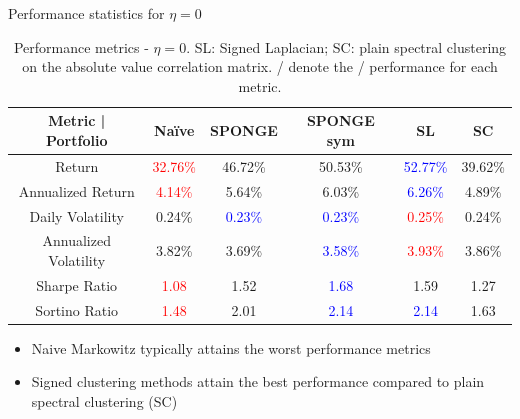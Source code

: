 \documentclass[dvipsnames,mathserif]{beamer}
\begin{document}
\begin{frame}{Performance statistics for $\eta=0$}
   \footnotesize
\vfill


\begin{table}[H]
    \centering
     \renewcommand{\arraystretch}{0.99}
    \begin{tabular}{|c|c|c|c|c|c|}
    \hline
    Metric | Portfolio & Naïve & SPONGE  & SPONGE sym & SL & SC \\ \hline
    Return & \textcolor{red}{32.76\%} & 46.72\% & 50.53\% & \textcolor{blue}{52.77\%} & 39.62\%\\ \hline
    Annualized Return & \textcolor{red}{4.14\%} & 5.64\% & 6.03\% & \textcolor{blue}{6.26\%} & 4.89\% \\ \hline
    Daily Volatility & 0.24\% & \textcolor{blue}{0.23\%} & \textcolor{blue}{0.23\%} & \textcolor{red}{0.25\%} & 0.24\% \\ \hline
    Annualized Volatility & 3.82\% & 3.69\% & \textcolor{blue}{3.58\%} & \textcolor{red}{3.93\%} &3.86\%\\ \hline
    Sharpe Ratio & \textcolor{red}{1.08} & 1.52 & \textcolor{blue}{1.68} & 1.59 &1.27\\ \hline
    Sortino Ratio & \textcolor{red}{1.48} & 2.01 & \textcolor{blue}{2.14} & \textcolor{blue}{2.14} & 1.63\\ \hline
    \end{tabular}
    \vspace{3mm}
\caption{Performance metrics - $\eta = 0$. SL: Signed Laplacian; SC: plain spectral clustering on the absolute value correlation matrix. / denote the / performance for each metric.}
\label{tab:perf metrics eta=0}
\end{table}


\vfill 

\begin{itemize}
\item Naive Markowitz typically attains  the worst performance metrics
\item Signed clustering methods attain the best performance compared to plain spectral clustering (SC)
\end{itemize}

\vfill 
\end{frame}
\end{document}
